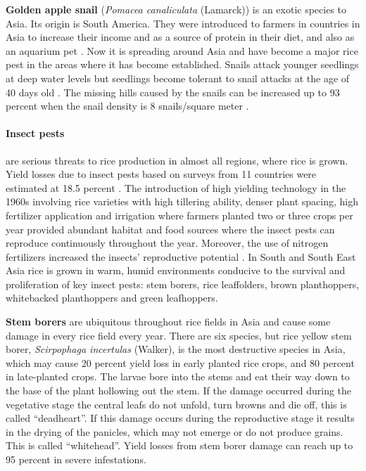 \documentclass[12pt, oneside]{report}
\begin{document}
\textbf{Golden apple snail} (\textit{Pomacea canaliculata} (Lamarck)) is an exotic species to Asia. Its origin is South America. They were introduced to farmers in countries in Asia to increase their income and as a source of protein in their diet, and also as an aquarium pet \citep{joshi2007problems}. Now it is spreading around Asia and have become a major rice pest in the areas where it has become established. Snails attack younger seedlings at deep water levels but seedlings become tolerant to snail attacks at the age of 40 days old \citep{sin2003damage}. The missing hills caused by the snails can be increased up to 93 percent when the snail density is 8 snails/square meter \citep{basilio1991problems}.

\paragraph{Insect pests} are serious threats to rice production in almost all regions, where rice is grown. Yield losses due to insect pests based on surveys from 11 countries were estimated at 18.5 percent \citep{pathak1994insect}. The introduction of high yielding technology in the 1960s involving rice varieties with high tillering ability, denser plant spacing, high fertilizer application and irrigation where farmers planted two or three crops per year provided abundant habitat and food sources where the insect pests can reproduce continuously throughout the year. Moreover, the use of nitrogen fertilizers increased the insects' reproductive potential \citep{bottrell2012resurrecting}. In South and South East Asia rice is grown in warm, humid environments conducive to the survival and proliferation of key insect pests: stem borers, rice leaffolders, brown planthoppers, whitebacked planthoppers and green leafhoppers.

\textbf{Stem borers} are ubiquitous throughout rice fields in Asia and cause some damage in every rice field every year. There are six species, but rice yellow stem borer, \textit{Scirpophaga incertulas} (Walker), is the most destructive species in Asia, which may cause 20 percent yield loss in early planted rice crops, and 80 percent in late-planted crops. The larvae bore into the stems and eat their way down to the base of the plant hollowing out the stem. If the damage occurred during the vegetative stage the central leafs do not unfold, turn browns and die off, this is called ``deadheart''. If this damage occurs during the reproductive stage it results in the drying of the panicles, which may not emerge or do not produce grains. This is called ``whitehead''. Yield losses from stem borer damage can reach up to 95 percent in severe infestations. 
\end{document}
